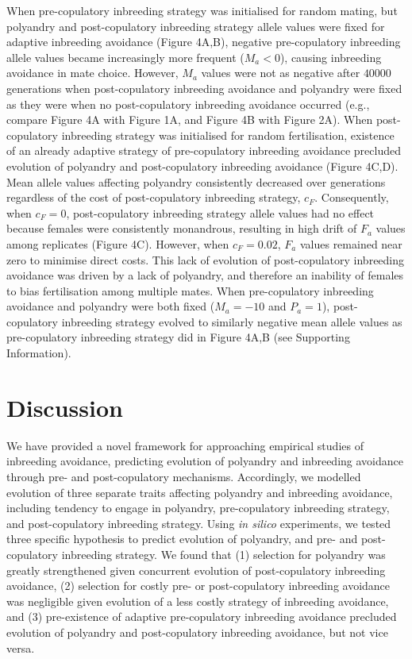 \documentclass[10pt,letterpaper]{article}
\begin{document}
When pre-copulatory inbreeding strategy was initialised for random mating, but polyandry and post-copulatory inbreeding strategy allele values were fixed for adaptive inbreeding avoidance (Figure 4A,B), negative pre-copulatory inbreeding allele values became increasingly more frequent ($M_{a}<0$), causing inbreeding avoidance in mate choice. However, $M_{a}$ values were not as negative after $40000$ generations when post-copulatory inbreeding avoidance and polyandry were fixed as they were when no post-copulatory inbreeding avoidance occurred (e.g., compare Figure 4A with Figure 1A, and Figure 4B with Figure 2A). When post-copulatory inbreeding strategy was initialised for random fertilisation, existence of an already adaptive strategy of pre-copulatory inbreeding avoidance precluded evolution of polyandry and post-copulatory inbreeding avoidance (Figure 4C,D). Mean allele values affecting polyandry consistently decreased over generations regardless of the cost of post-copulatory inbreeding strategy, $c_{F}$. Consequently, when $c_{F}=0$, post-copulatory inbreeding strategy allele values had no effect because females were consistently monandrous, resulting in high drift of $F_{a}$ values among replicates (Figure 4C). However, when $c_{F}=0.02$, $F_{a}$ values remained near zero to minimise direct costs. This lack of evolution of post-copulatory inbreeding avoidance was driven by a lack of polyandry, and therefore an inability of females to bias fertilisation among multiple mates. When pre-copulatory inbreeding avoidance and polyandry were both fixed ($M_{a}=-10$ and $P_{a}=1$), post-copulatory inbreeding strategy evolved to similarly negative mean allele values as pre-copulatory inbreeding strategy did in Figure 4A,B (see Supporting Information). 

\section*{Discussion}

We have provided a novel framework for approaching empirical studies of inbreeding avoidance, predicting evolution of polyandry and inbreeding avoidance through pre- and post-copulatory mechanisms. Accordingly, we modelled evolution of three separate traits affecting polyandry and inbreeding avoidance, including tendency to engage in polyandry, pre-copulatory inbreeding strategy, and post-copulatory inbreeding strategy. Using \textit{in silico} experiments, we tested three specific hypothesis to predict evolution of polyandry, and pre- and post-copulatory inbreeding strategy. We found that (1) selection for polyandry was greatly strengthened given concurrent evolution of post-copulatory inbreeding avoidance, (2) selection for costly pre- or post-copulatory inbreeding avoidance was negligible given evolution of a less costly strategy of inbreeding avoidance, and (3) pre-existence of adaptive pre-copulatory inbreeding avoidance precluded evolution of polyandry and post-copulatory inbreeding avoidance, but not vice versa.
\end{document}
